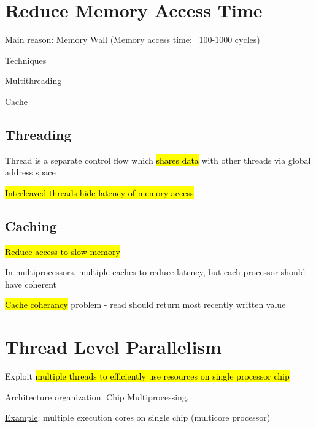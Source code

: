 \documentclass[12pt]{article}
\begin{document}
\begin{spacing}{1.5}
\section{Reduce Memory Access Time}

\begin{itemize*}
	\item Main reason: Memory Wall (Memory access time: ~100-1000 cycles)
	\item Techniques
		\begin{itemize*}
			\item Multithreading
			\item Cache
		\end{itemize*}
\end{itemize*}

\subsection{Threading}

\begin{itemize*}
	\item Thread is a separate control flow which \hl{shares data} with other threads via global address space
	\item \hl{Interleaved threads hide latency of memory access}
\end{itemize*}

\subsection{Caching}

\begin{itemize*}
	\item \hl{Reduce access to slow memory}
	\item In multiprocessors, multiple caches to reduce latency, but each processor should have coherent 
	\item \hl{Cache coherancy} problem - read should return most recently written value
\end{itemize*}

\section{Thread Level Parallelism}

\begin{itemize*}
	\item Exploit \hl{multiple threads to efficiently use resources on single processor chip}
	\item Architecture organization: Chip Multiprocessing. 
	\begin{itemize*}
		\item \underline{Example}: multiple execution cores on single chip (multicore processor)
	\end{itemize*}
\end{itemize*}


\end{spacing}
\end{document}
